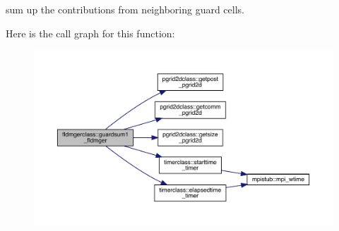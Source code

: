 sum up the contributions from neighboring guard cells. 

Here is the call graph for this function\+:
\nopagebreak
\begin{figure}[H]
\begin{center}
\leavevmode
\includegraphics[width=350pt]{namespacefldmgerclass_a54886b0763b8458a0560ccf7087b07f1_cgraph}
\end{center}
\end{figure}
